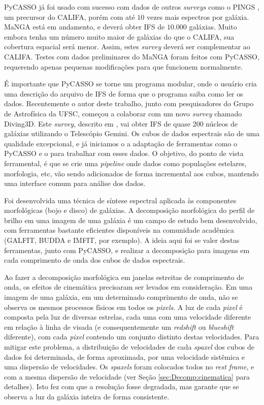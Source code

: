 PyCASSO já foi usado com sucesso com dados de outros {\em surveys} como o PINGS
\citep{RosalesOrtega2010}, um precursor do CALIFA, porém com até $10$ vezes mais
espectros por galáxia. MaNGA \citep{Bundy2015} está em andamento, e deverá obter
IFS de $10.000$ galáxias. Muito embora tenha um número muito maior de galáxias
do que o CALIFA, sua cobertura espacial será menor. Assim, estes {\em survey}
deverá ser complementar ao CALIFA. Testes com dados preliminares do MaNGA foram feitos
com PyCASSO, requerendo apenas pequenas modificações para que funcionem
normalmente.

É importante que PyCASSO se torne um programa modular, onde o usuário cria uma
descrição do arquivo de IFS de forma que o programa saiba como ler os dados.
Recentemente o autor deste trabalho, junto com pesquisadores do Grupo de
Astrofísica da UFSC, começou a colaborar com um novo {\em survey} chamado
Diving3D. Este {\em survey}, descrito em \citet{Ricci2014}, vai obter IFS de
quase 200 núcleos de galáxias utilizando o Telescópio Gemini. Os cubos de dados
espectrais são de uma qualidade excepcional, e já iniciamos o a adaptação de
ferramentas como o PyCASSO e o \starlight para trabalhar com esses dados. O
objetivo, do ponto de vista ferramental, é que se crie uma {\em pipeline} onde
dados como populações estelares, morfologia, etc, vão sendo adicionados de forma
incremental aos cubos, mantendo uma interface comum para análise dos dados.

Foi desenvolvida uma técnica de síntese espectral aplicada às componentes
morfológicas (bojo e disco) de galáxias. A decomposição morfológica do perfil de
brilho em uma imagem de uma galáxia é um campo de estudo bem desenvolvido, com
ferramentas bastante eficientes disponíveis na comunidade acadêmica (GALFIT,
BUDDA e IMFIT, por exemplo). A ideia aqui foi se valer destas ferramentas, junto
com PyCASSO, e realizar a decomposição para imagens em cada comprimento de onda
dos cubos de dados espectrais.

Ao fazer a decomposição morfológica em janelas estreitas de comprimento de onda,
os efeitos de cinemática precisaram ser levados em consideração. Em uma imagem
de uma galáxia, em um determinado comprimento de onda, não se observa os mesmos
processos físicos em todos os {\em pixels}. A luz de cada {\em pixel} é composta
pela luz de diversas estrelas, cada uma com uma velocidade diferente em relação
à linha de visada (e consequentemente um {\em redshift} ou {\em blueshift}
diferente), com cada {\em pixel} contendo um conjunto distinto destas
velocidades. Para mitigar este problema, a distribuição de velocidades de cada
{\em spaxel} dos cubos de dados foi determinada, de forma aproximada, por uma
velocidade sistêmica e uma dispersão de velocidades. Os {\em spaxels} foram
colocados todos no {\em rest frame}, e com a mesma dispersão de velocidade (ver
Seção \ref{sec:Decomp:cinematica} para detalhes). Isto fez com que a resolução
fosse degradada, mas garante que se observa a luz da galáxia inteira de forma
consistente.

